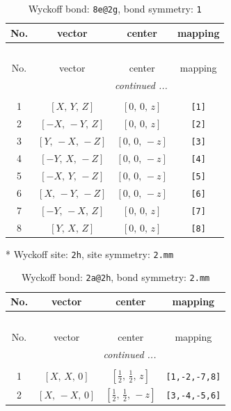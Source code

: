 \documentclass[fleqn,8pt]{jsarticle}
\begin{document}
\begin{longtable}{cccc}
\caption{Wyckoff bond: {\tt 8e@2g}, bond symmetry: {\tt 1}}
 \\
 \hline \hline
No. & vector & center & mapping \\ \hline \endfirsthead

\multicolumn{3}{l}{\tablename\ \thetable{}} \\
 \hline \hline
No. & vector & center & mapping \\ \hline \endhead

 \hline \hline
\multicolumn{3}{r}{\footnotesize\it continued ...} \\ \endfoot

 \hline \hline
\multicolumn{3}{r}{} \\ \endlastfoot

1 & $\left[ X,\, Y,\, Z \right]$ & $\left[ 0,\, 0,\, z \right]$ & {\tt [1]} \\ \hline
2 & $\left[ - X,\, - Y,\, Z \right]$ & $\left[ 0,\, 0,\, z \right]$ & {\tt [2]} \\ \hline
3 & $\left[ Y,\, - X,\, - Z \right]$ & $\left[ 0,\, 0,\, - z \right]$ & {\tt [3]} \\ \hline
4 & $\left[ - Y,\, X,\, - Z \right]$ & $\left[ 0,\, 0,\, - z \right]$ & {\tt [4]} \\ \hline
5 & $\left[ - X,\, Y,\, - Z \right]$ & $\left[ 0,\, 0,\, - z \right]$ & {\tt [5]} \\ \hline
6 & $\left[ X,\, - Y,\, - Z \right]$ & $\left[ 0,\, 0,\, - z \right]$ & {\tt [6]} \\ \hline
7 & $\left[ - Y,\, - X,\, Z \right]$ & $\left[ 0,\, 0,\, z \right]$ & {\tt [7]} \\ \hline
8 & $\left[ Y,\, X,\, Z \right]$ & $\left[ 0,\, 0,\, z \right]$ & {\tt [8]} \\
\end{longtable}
* Wyckoff site: {\tt 2h}, site symmetry: {\tt 2.mm}
\renewcommand{\arraystretch}{1.2}
\begin{longtable}{cccc}
\caption{Wyckoff bond: {\tt 2a@2h}, bond symmetry: {\tt 2.mm}}
 \\
 \hline \hline
No. & vector & center & mapping \\ \hline \endfirsthead

\multicolumn{3}{l}{\tablename\ \thetable{}} \\
 \hline \hline
No. & vector & center & mapping \\ \hline \endhead

 \hline \hline
\multicolumn{3}{r}{\footnotesize\it continued ...} \\ \endfoot

 \hline \hline
\multicolumn{3}{r}{} \\ \endlastfoot

1 & $\left[ X,\, X,\, 0 \right]$ & $\left[ \frac{1}{2},\, \frac{1}{2},\, z \right]$ & {\tt [1,-2,-7,8]} \\ \hline
2 & $\left[ X,\, - X,\, 0 \right]$ & $\left[ \frac{1}{2},\, \frac{1}{2},\, - z \right]$ & {\tt [3,-4,-5,6]} \\
\end{longtable}
\end{document}
